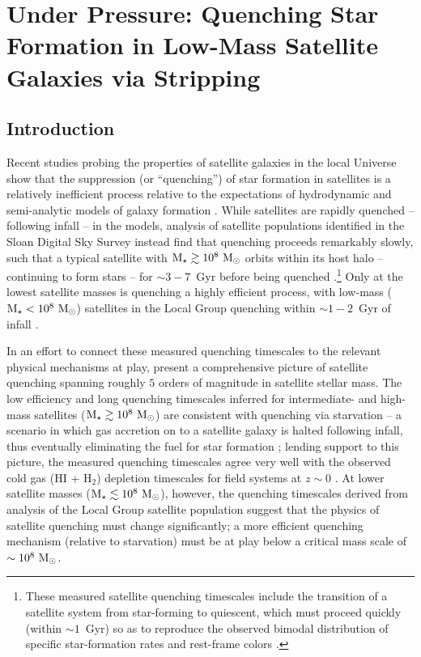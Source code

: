 


\chapter{Under Pressure: Quenching Star Formation in Low-Mass Satellite Galaxies via
  Stripping}



\section{Introduction}
\label{sec:intro} 

Recent studies probing the properties of satellite galaxies in the
local Universe show that the suppression (or ``quenching'') of star
formation in satellites is a relatively inefficient process relative
to the expectations of hydrodynamic and semi-analytic models of galaxy
formation \citep[e.g.][]{kimm09, kimm11, wang14, hirschmann14,
  phillips15a}.
%
While satellites are rapidly quenched -- following infall -- in the
models, analysis of satellite populations identified in the Sloan
Digital Sky Survey \citep[SDSS,][]{york00} instead find that quenching
proceeds remarkably slowly, such that a typical satellite with ${\rm M}_{\star}
\gtrsim 10^{8}~{\rm M}_{\odot}$ orbits within its host halo -- continuing to
form stars -- for $\sim3-7$~Gyr before being quenched
\citep{delucia12, wetzel13, wheeler14}.\footnote{These measured
  satellite quenching timescales include the transition of a satellite
  system from star-forming to quiescent, which must proceed quickly
  (within $\sim1$~Gyr) so as to reproduce the observed bimodal
  distribution of specific star-formation rates and rest-frame colors
  \citep{balogh04, wetzel13}.}
%
Only at the lowest satellite masses is quenching a highly efficient
process, with low-mass (${\rm M}_{\star} < 10^{8}~{\rm M}_{\odot}$) satellites in the
Local Group quenching within $\sim1-2$~Gyr of infall \citep{weisz15,
  wetzel15b, fham15}.



In an effort to connect these measured quenching timescales to the
relevant physical mechanisms at play, \citet{fham15} present
a comprehensive picture of satellite quenching spanning
roughly $5$ orders of magnitude in satellite stellar mass.
%
The low efficiency and long quenching timescales inferred for
intermediate- and high-mass satellites (${\rm M}_{\star} \gtrsim 10^{8}~{\rm M}_{\odot}$)
are consistent with quenching via starvation -- a scenario in which
gas accretion on to a satellite galaxy is halted following infall,
thus eventually eliminating the fuel for star formation
\citep{larson80, kawata08};
%
lending support to this picture, the measured quenching timescales
agree very well with the observed cold gas (H{\scriptsize I} +
H$_{2}$) depletion timescales for field systems at $z \sim 0$
\citep{fham15}.
%
At lower satellite masses (${\rm M}_{\star} \lesssim 10^{8}~{\rm M}_{\odot}$), however,
the quenching timescales derived from analysis of the Local Group
satellite population suggest that the physics of satellite quenching
must change significantly; a more efficient quenching mechanism
(relative to starvation) must be at play below a critical mass scale
of $\sim10^{8}~{\rm M}_{\odot}$.


